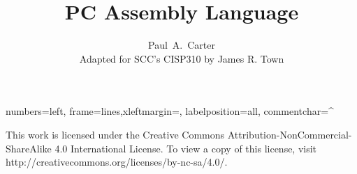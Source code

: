 \documentclass[11pt]{book}
\author{Paul~A.~Carter \\Adapted for SCC's CISP310 by James R. Town}
\title{PC Assembly Language}
\newif\ifmypdf
\begin{document}
\maketitle
\newlength{\AsmMargin}
\setlength{\AsmMargin}{-1cm}
{numbers=left, frame=lines,xleftmargin=\AsmMargin, labelposition=all, commentchar=^ }

\newcommand{\MarginNote}[1]{\marginpar{\sloppy \em \small #1}}
\thispagestyle{empty}
\vspace*{\fill}
\noindent This work is licensed under the Creative Commons 
Attribution-NonCommercial-ShareAlike 4.0 International License. To view
a copy of this license, visit
{\code http://creativecommons.org/licenses/by-nc-sa/4.0/}.



\vfill
\frontmatter

%
\mainmatter
\begin{appendix}

\end{appendix}
\clearpage
\ifmypdf
\phantomsection %
\fi
{}
\printindex
\end{document}
